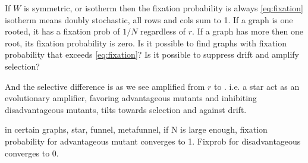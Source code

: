 If $W$ is symmetric, or isotherm then the fixation probability is always \ref{eq:fixation}
isotherm means doubly stochastic, all rows and cols sum to 1. 
If a graph is one rooted, it has a fixation prob of $1/N$ regardless of $r$. If a graph has more then one root, its fixation probability is zero. 
Is it possible to find graphs with fixation probability that exceeds \ref{eq:fixation}? Is it possible to suppress drift and amplify selection?

And the selective difference is as we see amplified from $r$ to . i.e. a star act as an evolutionary amplifier,
 favoring advantageous mutants and inhibiting disadvantageous mutants, tilts towards selection and against drift.
 
 
 in certain graphs, star, funnel, metafunnel, if N is large enough, fixation probability for advantageous mutant converges to 1. Fixprob for disadvantageous converges to 0.
